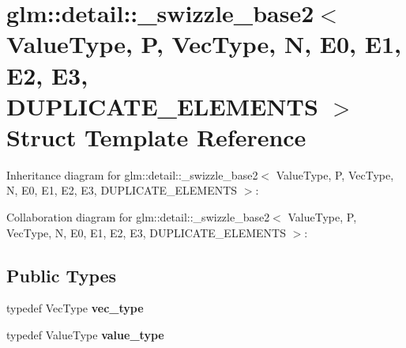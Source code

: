 \hypertarget{structglm_1_1detail_1_1__swizzle__base2}{\section{glm\-:\-:detail\-:\-:\-\_\-swizzle\-\_\-base2$<$ Value\-Type, P, Vec\-Type, N, E0, E1, E2, E3, D\-U\-P\-L\-I\-C\-A\-T\-E\-\_\-\-E\-L\-E\-M\-E\-N\-T\-S $>$ Struct Template Reference}
\label{structglm_1_1detail_1_1__swizzle__base2}
}


Inheritance diagram for glm\-:\-:detail\-:\-:\-\_\-swizzle\-\_\-base2$<$ Value\-Type, P, Vec\-Type, N, E0, E1, E2, E3, D\-U\-P\-L\-I\-C\-A\-T\-E\-\_\-\-E\-L\-E\-M\-E\-N\-T\-S $>$\-:


Collaboration diagram for glm\-:\-:detail\-:\-:\-\_\-swizzle\-\_\-base2$<$ Value\-Type, P, Vec\-Type, N, E0, E1, E2, E3, D\-U\-P\-L\-I\-C\-A\-T\-E\-\_\-\-E\-L\-E\-M\-E\-N\-T\-S $>$\-:
\subsection*{Public Types}
\begin{DoxyCompactItemize}
\item 
\hypertarget{structglm_1_1detail_1_1__swizzle__base2_a5f999904e676a4f5b0bdaa157415ee1c}{typedef Vec\-Type {\bfseries vec\-\_\-type}}\label{structglm_1_1detail_1_1__swizzle__base2_a5f999904e676a4f5b0bdaa157415ee1c}

\item 
\hypertarget{structglm_1_1detail_1_1__swizzle__base2_a656c11aaeeaca042deed88711c9dc063}{typedef Value\-Type {\bfseries value\-\_\-type}}\label{structglm_1_1detail_1_1__swizzle__base2_a656c11aaeeaca042deed88711c9dc063}

\end{DoxyCompactItemize}
